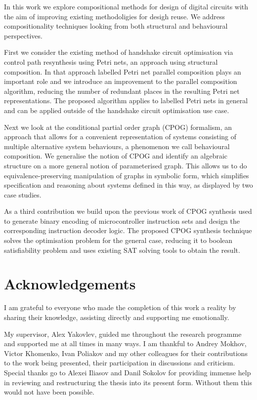 \documentclass[12pt,english,british]{report}
\begin{document}
\tableofcontents

\listoffigures
\listoftables

\abstract
 
In this work we explore compositional methods for design of digital circuits with the aim of improving 
existing methodoligies for desigh reuse. We address compositionality techniques 
looking from both structural and behavioural perspectives.

First we consider the existing method of handshake circuit optimisation via control path 
resynthesis using Petri nets, an approach using structural composition. 
In that approach labelled Petri net parallel composition plays an important role
and we introduce an improvement to the parallel composition algorithm, reducing the number of redundant places in 
the resulting Petri net representations. The proposed algorithm applies to labelled Petri nets in general
and can be applied outside of the handshake circuit optimisation use case.

Next we look at the conditional partial order graph (CPOG) formalism, an approach that allows for a convenient representation of systems
consisting of multiple alternative system behaviours, a phenomenon we call behavioural composition.
We generalise the notion of CPOG and identify an algebraic structure on a more general notion of parameterised graph.
This allows us to do equivalence-preserving manipulation of graphs in symbolic form, which simplifies
specification and reasoning about systems defined in this way, as displayed by two case studies.

As a third contribution we build upon the previous work of CPOG synthesis used 
to generate binary encoding of microcontroller instruction sets and design the corresponding instruction decoder logic. 
The proposed CPOG synthesis technique solves the optimisation problem for the
general case, reducing it to boolean satisfiability problem and uses existing 
SAT solving tools to obtain the result.


\chapter*{Acknowledgements}

I am grateful to everyone who made the completion of this work a reality by sharing their knowledge, assisting directly and supporting me emotionally.

My supervisor, Alex Yakovlev, guided me throughout the research programme and supported me at all times in many ways.
I am thankful to Andrey Mokhov, Victor Khomenko, Ivan Poliakov and my other colleagues for their contributions
to the work being presented, their participation in discussions and criticism.
Special thanks go to Alexei Iliasov and Danil Sokolov for providing immense help in reviewing 
and restructuring the thesis into its present form. Without them this would not have been possible.
\end{document}

